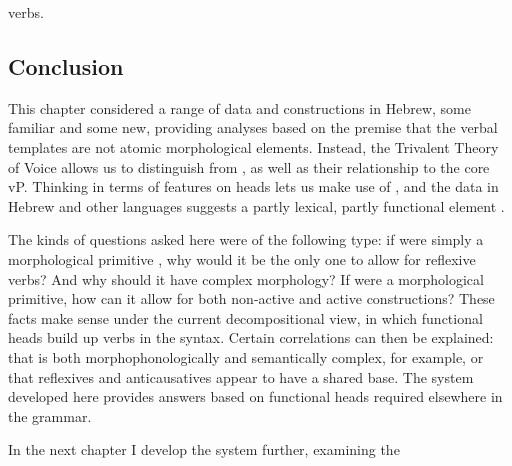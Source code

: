 \begin{exe}
\begin{xlist}
\begin{xlist}
\begin{exe}
\begin{xlist}
\begin{xlist}
\begin{exe}
\begin{xlist}
\begin{xlist}
\begin{exe}
\begin{exe}
\begin{xlist}
\begin{exe}
\begin{exe}
\begin{xlist}
\begin{exe}
\begin{exe}
\begin{exe}
\begin{exe}
\begin{exe}
\begin{xlist}
\begin{exe}
\begin{xlist}
\begin{exe}
\begin{exe}
\begin{xlist}
\begin{exe}
\begin{xlist}
\begin{exe}
\begin{xlist}
\begin{exe}
\begin{exe}
\begin{exe}
\begin{xlist}
\begin{exe}
\begin{exe}
\begin{exe}
\begin{xlist}
\begin{exe}
\begin{xlist}
\begin{exe}
\begin{xlist}
\begin{exe}
\begin{xlist}
\begin{exe}
\begin{exe}
\begin{exe}
\begin{exe}
\begin{xlist}
\begin{exe}
\begin{xlist}
\begin{exe}
\begin{xlist}
\begin{exe}
\begin{xlist}
\begin{exe}
\begin{xlist}
\begin{exe}
\begin{xlist}
\begin{exe}
\begin{exe}
\begin{exe}
\begin{exe}
\begin{xlist}
\begin{exe}
\begin{xlist}
\begin{exe}
\begin{xlist}
\begin{exe}
\begin{exe}
\begin{xlist}
\begin{exe}
\begin{xlist}
\begin{exe}
\begin{exe}
\begin{exe}
\begin{exe}
\begin{xlist}
\begin{xlist}
\begin{exe}
\begin{xlist}
\begin{exe}
\begin{exe}
\begin{exe}
\begin{xlist}
\begin{exe}
\begin{exe}
\begin{xlist}
\begin{exe}
\begin{exe}
\begin{exe}
\begin{xlist}
\begin{xlist}
\begin{exe}
\begin{xlist}
\begin{exe}
\begin{exe}
\begin{exe}
\begin{exe}
\begin{xlist}
\begin{exe}
\begin{xlist}
\begin{exe}
\begin{xlist}
\begin{exe}
\begin{xlist}
\begin{exe}
\begin{exe}
\begin{exe}
\begin{exe}
\begin{exe}
\begin{exe}
\begin{xlist}
\begin{exe}
\begin{xlist}
\begin{exe}
\begin{xlist}
\begin{exe}
\begin{xlist}
\begin{exe}
\begin{xlist}
\begin{exe}
\begin{xlist}
\begin{exe}
\begin{xlist}
\begin{exe}
\begin{xlist}
\begin{exe}
\begin{xlist}
verbs.

	\subsection{Conclusion} \label{vz:others:conc}
This chapter considered a range of data and constructions in Hebrew, some familiar and some new, providing analyses based on the premise that the verbal templates are not atomic morphological elements. Instead, the Trivalent Theory of Voice allows us to distinguish  from {\vz}, as well as their relationship to the core vP. Thinking in terms of features on heads lets us make use of {\pz}, and the data in Hebrew and other languages suggests a partly lexical, partly functional element {\va}.

The kinds of questions asked here were of the following type: if {\thit} were simply a morphological primitive \citep{reinhartsiloni05}, why would it be the only one to allow for reflexive verbs? And why should it have complex morphology? If {\tnif} were a morphological primitive, how can it allow for both non-active and active constructions? These facts make sense under the current decompositional view, in which functional heads build up verbs in the syntax. Certain correlations can then be explained: that {\thit} is both morphophonologically and semantically complex, for example, or that reflexives and anticausatives appear to have a shared base. The system developed here provides answers based on functional heads required elsewhere in the grammar.

In the next chapter I develop the system further, examining the 
\end{xlist}
\end{exe}
\end{xlist}
\end{exe}
\end{xlist}
\end{exe}
\end{xlist}
\end{exe}
\end{xlist}
\end{exe}
\end{xlist}
\end{exe}
\end{xlist}
\end{exe}
\end{xlist}
\end{exe}
\end{xlist}
\end{exe}
\end{exe}
\end{exe}
\end{exe}
\end{exe}
\end{exe}
\end{xlist}
\end{exe}
\end{xlist}
\end{exe}
\end{xlist}
\end{exe}
\end{xlist}
\end{exe}
\end{exe}
\end{exe}
\end{exe}
\end{xlist}
\end{exe}
\end{xlist}
\end{xlist}
\end{exe}
\end{exe}
\end{exe}
\end{xlist}
\end{exe}
\end{exe}
\end{xlist}
\end{exe}
\end{exe}
\end{exe}
\end{xlist}
\end{exe}
\end{xlist}
\end{xlist}
\end{exe}
\end{exe}
\end{exe}
\end{exe}
\end{xlist}
\end{exe}
\end{xlist}
\end{exe}
\end{exe}
\end{xlist}
\end{exe}
\end{xlist}
\end{exe}
\end{xlist}
\end{exe}
\end{exe}
\end{exe}
\end{exe}
\end{xlist}
\end{exe}
\end{xlist}
\end{exe}
\end{xlist}
\end{exe}
\end{xlist}
\end{exe}
\end{xlist}
\end{exe}
\end{xlist}
\end{exe}
\end{exe}
\end{exe}
\end{exe}
\end{xlist}
\end{exe}
\end{xlist}
\end{exe}
\end{xlist}
\end{exe}
\end{xlist}
\end{exe}
\end{exe}
\end{exe}
\end{xlist}
\end{exe}
\end{exe}
\end{exe}
\end{xlist}
\end{exe}
\end{xlist}
\end{exe}
\end{xlist}
\end{exe}
\end{exe}
\end{xlist}
\end{exe}
\end{xlist}
\end{exe}
\end{exe}
\end{exe}
\end{exe}
\end{exe}
\end{xlist}
\end{exe}
\end{exe}
\end{xlist}
\end{exe}
\end{exe}
\end{xlist}
\end{xlist}
\end{exe}
\end{xlist}
\end{xlist}
\end{exe}
\end{xlist}
\end{xlist}
\end{exe}

